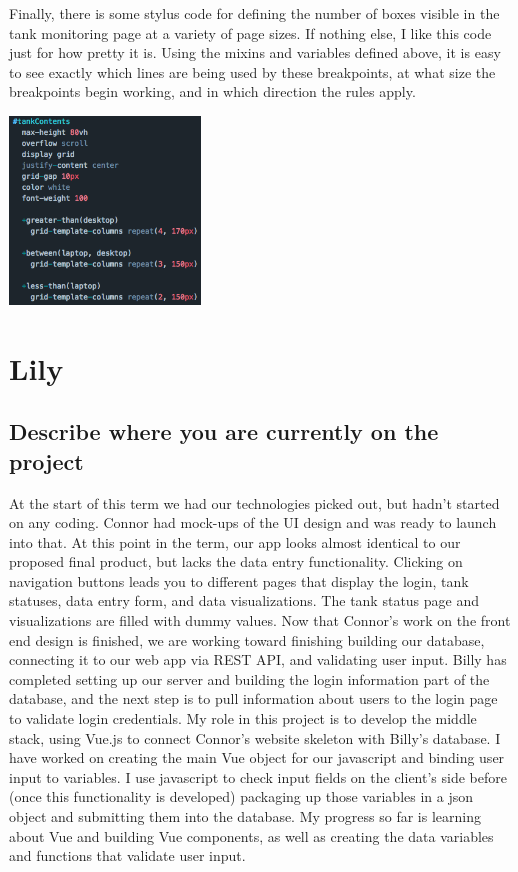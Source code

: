 \documentclass[draftclsnofoot,onecolumn,letterpaper,10pt,compsoc]{IEEEtran}
\begin{document}
\lstset{language=Stylus}


Finally, there is some stylus code for defining the number of boxes visible in the tank monitoring page at a variety of page sizes.
If nothing else, I like this code just for how pretty it is.
Using the mixins and variables defined above, it is easy to see exactly which lines are being used by these breakpoints, at what size the breakpoints begin working, and in which direction the rules apply.

\centerline{\includegraphics[height=5cm]{screenshots/stylus.png}}

\section{Lily}
\subsection{Describe where you are currently on the project}
At the start of this term we had our technologies picked out, but hadn’t started on any coding. Connor had mock-ups of the UI design and was ready to launch into that. At this point in the term, our app looks almost identical to our proposed final product, but lacks the data entry functionality. Clicking on navigation buttons leads you to different pages that display the login, tank statuses, data entry form, and data visualizations. The tank status page and visualizations are filled with dummy values. Now that Connor’s work on the front end design is finished, we are working toward finishing building our database, connecting it to our web app via REST API, and validating user input. Billy has completed setting up our server and building the login information part of the database, and the next step is to pull information about users to the login page to validate login credentials. My role in this project is to develop the middle stack, using Vue.js to connect Connor’s website skeleton with Billy’s database. I have worked on creating the main Vue object for our javascript and binding user input to variables. I use javascript to check input fields on the client’s side before (once this functionality is developed) packaging up those variables in a json object and submitting them into the database. My progress so far is learning about Vue and building Vue components, as well as creating the data variables and functions that validate user input.
\end{document}
